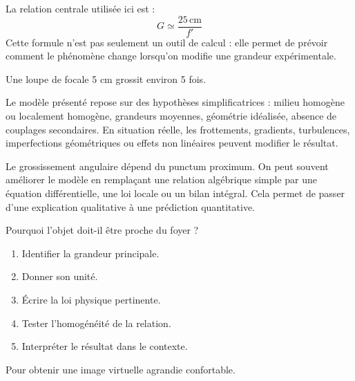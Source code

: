 \documentclass[11pt,a4paper]{article}
\begin{document}
\begin{theorembox}
La relation centrale utilisée ici est :
\[
G\simeq \frac{25\,\mathrm{cm}}{f'}
\]
Cette formule n'est pas seulement un outil de calcul : elle permet de prévoir comment le phénomène change lorsqu'on modifie une grandeur expérimentale.
\end{theorembox}

\begin{odgbox}
Une loupe de focale 5 cm grossit environ 5 fois.
\end{odgbox}

\begin{attentionbox}
Le modèle présenté repose sur des hypothèses simplificatrices : milieu homogène ou localement homogène, grandeurs moyennes, géométrie idéalisée, absence de couplages secondaires. En situation réelle, les frottements, gradients, turbulences, imperfections géométriques ou effets non linéaires peuvent modifier le résultat.
\end{attentionbox}

\begin{approfondissementbox}
Le grossissement angulaire dépend du punctum proximum.
On peut souvent améliorer le modèle en remplaçant une relation algébrique simple par une équation différentielle, une loi locale ou un bilan intégral. Cela permet de passer d'une explication qualitative à une prédiction quantitative.
\end{approfondissementbox}

\begin{exercicebox}
Pourquoi l'objet doit-il être proche du foyer ?
\begin{enumerate}
  \item Identifier la grandeur principale.
  \item Donner son unité.
  \item Écrire la loi physique pertinente.
  \item Tester l'homogénéité de la relation.
  \item Interpréter le résultat dans le contexte.
\end{enumerate}
\end{exercicebox}

\begin{corrigebox}[Indication]
Pour obtenir une image virtuelle agrandie confortable.
\end{corrigebox}
\end{document}
